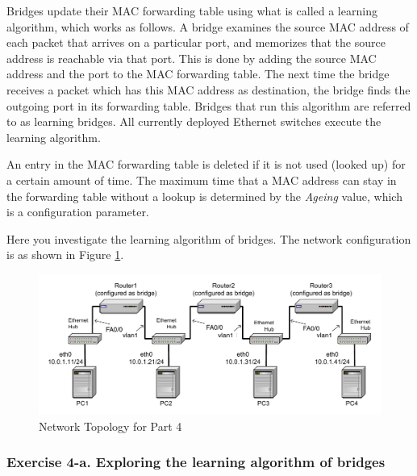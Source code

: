 Bridges update their MAC forwarding table using what is called a learning algorithm, which works as follows. A bridge examines the source MAC address of each packet that arrives on a particular port, and memorizes that the source address is reachable via that port. This is done by adding the source MAC address and the port to the MAC forwarding table. The next time the bridge receives a packet which has this MAC address as destination, the bridge finds the outgoing port in its forwarding table. Bridges that run this algorithm are referred to as learning bridges. All currently deployed Ethernet switches execute the learning algorithm.

An entry in the MAC forwarding table is deleted if it is not used (looked up) for a certain amount of time. The maximum time that a MAC address can stay in the forwarding table without a lookup is determined by the \emph{Ageing} value, which is a configuration parameter.

Here you investigate the learning algorithm of bridges. The network configuration is as shown in Figure \ref{fig:lab6-network4}.

\begin{figure}[h!t]
	\centering
	\includegraphics[width=\linewidth]{graphics/lab6-network4-updated.pdf}	
	\caption{Network Topology for Part 4}
	\label{fig:lab6-network4}
\end{figure}

\subsubsection{Exercise 4-a. Exploring the learning algorithm of bridges}

